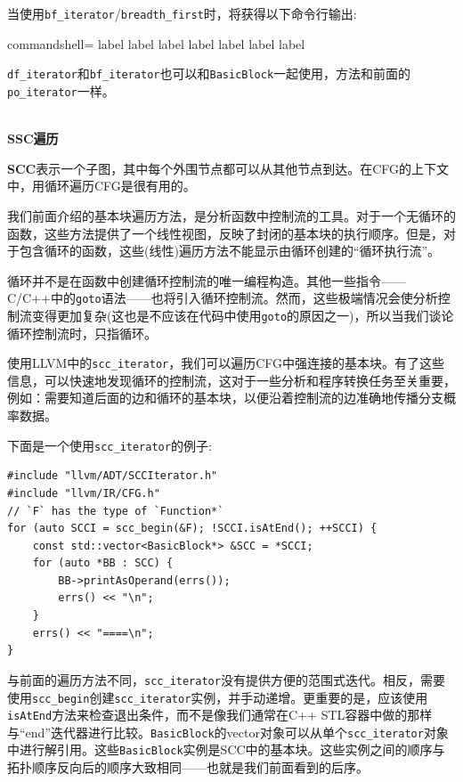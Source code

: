 当使用\texttt{bf\_iterator}/\texttt{breadth\_first}时，将获得以下命令行输出:

\begin{tcblisting}{commandshell={}}
label %
label %
label %
label %
label %
label %
label %
\end{tcblisting}

\texttt{df\_iterator}和\texttt{bf\_iterator}也可以和\texttt{BasicBlock}一起使用，方法和前面的\texttt{po\_iterator}一样。

\hspace*{\fill} \\ %
\noindent
\textbf{SSC遍历}

\textbf{SCC}表示一个子图，其中每个外围节点都可以从其他节点到达。在CFG的上下文中，用循环遍历CFG是很有用的。

我们前面介绍的基本块遍历方法，是分析函数中控制流的工具。对于一个无循环的函数，这些方法提供了一个线性视图，反映了封闭的基本块的执行顺序。但是，对于包含循环的函数，这些(线性)遍历方法不能显示由循环创建的“循环执行流”。

\begin{tcolorbox}[colback=blue!5!white,colframe=blue!75!black, fonttitle=\bfseries,title=重复控制流]	
\hspace*{0.7cm}循环并不是在函数中创建循环控制流的唯一编程构造。其他一些指令——C/C++中的\texttt{goto}语法——也将引入循环控制流。然而，这些极端情况会使分析控制流变得更加复杂(这也是不应该在代码中使用\texttt{goto}的原因之一)，所以当我们谈论循环控制流时，只指循环。
\end{tcolorbox}

使用LLVM中的\texttt{scc\_iterator}，我们可以遍历CFG中强连接的基本块。有了这些信息，可以快速地发现循环的控制流，这对于一些分析和程序转换任务至关重要，例如：需要知道后面的边和循环的基本块，以便沿着控制流的边准确地传播分支概率数据。

下面是一个使用\texttt{scc\_iterator}的例子:

\begin{lstlisting}[style=styleCXX]
#include "llvm/ADT/SCCIterator.h"
#include "llvm/IR/CFG.h"
// `F` has the type of `Function*`
for (auto SCCI = scc_begin(&F); !SCCI.isAtEnd(); ++SCCI) {
	const std::vector<BasicBlock*> &SCC = *SCCI;
	for (auto *BB : SCC) {
		BB->printAsOperand(errs());
		errs() << "\n";
	}
	errs() << "====\n";
}
\end{lstlisting}

与前面的遍历方法不同，\texttt{scc\_iterator}没有提供方便的范围式迭代。相反，需要使用\texttt{scc\_begin}创建\texttt{scc\_iterator}实例，并手动递增。更重要的是，应该使用\texttt{isAtEnd}方法来检查退出条件，而不是像我们通常在C++ STL容器中做的那样与“end”迭代器进行比较。\texttt{BasicBlock}的vector对象可以从单个\texttt{scc\_iterator}对象中进行解引用。这些\texttt{BasicBlock}实例是SCC中的基本块。这些实例之间的顺序与拓扑顺序反向后的顺序大致相同——也就是我们前面看到的后序。 

